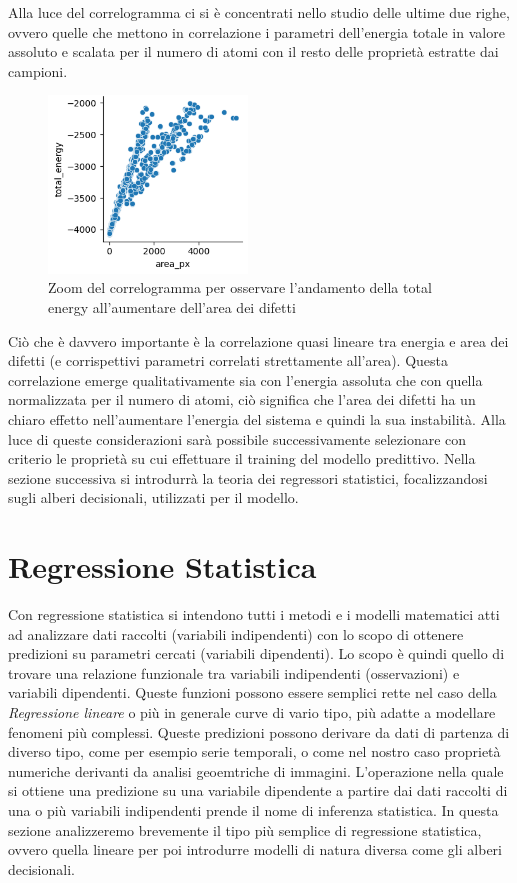 \documentclass[12pt,a4paper,openright,twoside]{report}
\begin{document}
Alla luce del correlogramma ci si è concentrati nello studio delle ultime due righe, ovvero
quelle che mettono in correlazione i parametri dell’energia totale in valore assoluto e scalata per il numero di atomi con il resto delle proprietà estratte dai campioni.
\begin{center}
\begin{figure}[h]
\centering
\includegraphics[width=200px,keepaspectratio]{energy_vs_area.png}
\caption{Zoom del correlogramma per osservare l’andamento della total energy
all’aumentare dell’area dei difetti}
\end{figure}    
\end{center}
Ciò che è davvero importante è la correlazione quasi lineare tra energia e area dei difetti (e corrispettivi parametri correlati strettamente all’area).
Questa correlazione emerge qualitativamente sia con l’energia assoluta che con quella
normalizzata per il numero di atomi, ciò significa che l’area dei difetti ha un chiaro effetto nell’aumentare l’energia del sistema e quindi la sua instabilità.
Alla luce di queste considerazioni sarà possibile successivamente selezionare con criterio le proprietà su cui effettuare il training del modello predittivo. 
Nella sezione successiva si introdurrà la teoria dei regressori statistici, focalizzandosi sugli alberi decisionali, utilizzati per il modello. 
\section{Regressione Statistica}
Con regressione statistica si intendono tutti i metodi e i modelli matematici atti ad analizzare dati raccolti (variabili indipendenti) con lo scopo di ottenere predizioni su parametri cercati (variabili dipendenti). 
Lo scopo è quindi quello di trovare una relazione funzionale tra variabili indipendenti (osservazioni) e variabili dipendenti.
Queste funzioni possono essere semplici rette nel caso della \emph{Regressione lineare} o più in generale curve di vario tipo, più adatte a modellare fenomeni più complessi.
Queste predizioni possono derivare da dati di partenza di diverso tipo, come per esempio serie temporali, o come nel nostro caso proprietà numeriche derivanti da analisi geoemtriche di immagini. L'operazione nella quale si ottiene una predizione su una variabile dipendente a partire dai dati raccolti di una o più variabili indipendenti prende il nome di inferenza statistica.
In questa sezione analizzeremo brevemente  il tipo più semplice di regressione statistica, ovvero quella lineare per poi introdurre modelli di natura diversa come gli alberi decisionali. 
\end{document}
